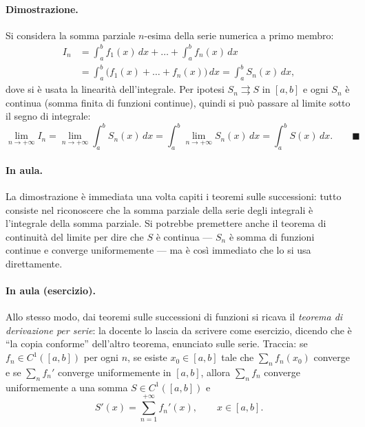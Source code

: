 \paragraph{Dimostrazione.} Si considera la somma parziale $n$-esima della serie numerica a
primo membro:
\begin{align*}
I_n&=\int_a^b f_1(x)\,dx+\dots+\int_a^b f_n(x)\,dx\\
&=\int_a^b\big(f_1(x)+\dots+f_n(x)\big)\,dx=\int_a^b S_n(x)\,dx,
\end{align*}
dove si è usata la linearità dell'integrale. Per ipotesi $S_n\rightrightarrows S$ in
$[a,b]$ e ogni $S_n$ è continua (somma finita di funzioni continue), quindi si può passare
al limite sotto il segno di integrale:
\begin{equation}
\lim_{n\to+\infty}I_n=\lim_{n\to+\infty}\int_a^b S_n(x)\,dx
=\int_a^b\lim_{n\to+\infty}S_n(x)\,dx=\int_a^b S(x)\,dx . \qquad\blacksquare
\end{equation}

\paragraph{In aula.} La dimostrazione è immediata una volta capiti i teoremi sulle
successioni: tutto consiste nel riconoscere che la somma parziale della serie degli
integrali è l'integrale della somma parziale. Si potrebbe premettere anche il teorema di
continuità del limite per dire che $S$ è continua — $S_n$ è somma di funzioni continue e
converge uniformemente — ma è così immediato che lo si usa direttamente.

\paragraph{In aula (esercizio).} Allo stesso modo, dai teoremi sulle successioni di
funzioni si ricava il \emph{teorema di derivazione per serie}: la docente lo lascia da
scrivere come esercizio, dicendo che è ``la copia conforme'' dell'altro teorema, enunciato
sulle serie. Traccia: se $f_n\in C^1([a,b])$ per ogni $n$, se esiste $x_0\in[a,b]$ tale
che $\sum_n f_n(x_0)$ converge e se $\sum_n f_n'$ converge uniformemente in $[a,b]$,
allora $\sum_n f_n$ converge uniformemente a una somma $S\in C^1([a,b])$ e
\[
S'(x)=\sum_{n=1}^{+\infty}f_n'(x),\qquad x\in[a,b].
\]

